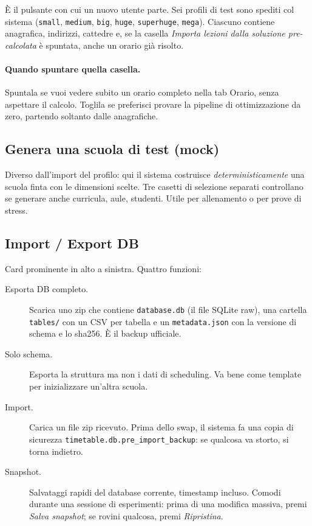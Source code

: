\`E il pulsante con cui un nuovo utente parte. Sei profili di
test sono spediti col sistema (\texttt{small}, \texttt{medium},
\texttt{big}, \texttt{huge}, \texttt{superhuge}, \texttt{mega}).
Ciascuno contiene anagrafica, indirizzi, cattedre e, se la
casella \emph{Importa lezioni dalla soluzione pre-calcolata} \`e
spuntata, anche un orario gi\`a risolto.

\paragraph{Quando spuntare quella casella.}
Spuntala se vuoi vedere subito un orario completo nella tab
Orario, senza aspettare il calcolo. Toglila se preferisci
provare la pipeline di ottimizzazione da zero, partendo
soltanto dalle anagrafiche.

\subsection{Genera una scuola di test (mock)}

Diverso dall'import del profilo: qui il sistema costruisce
\emph{deterministicamente} una scuola finta con le dimensioni
scelte. Tre casetti di selezione separati controllano se generare
anche curricula, aule, studenti. Utile per allenamento o per
prove di stress.

\subsection{Import / Export DB}

Card prominente in alto a sinistra. Quattro funzioni:

\begin{description}
\item[Esporta DB completo.] Scarica uno zip che contiene
  \texttt{database.db} (il file SQLite raw), una cartella
  \texttt{tables/} con un CSV per tabella e un
  \texttt{metadata.json} con la versione di schema e lo
  sha256. \`E il backup ufficiale.
\item[Solo schema.] Esporta la struttura ma non i dati di
  scheduling. Va bene come template per inizializzare un'altra
  scuola.
\item[Import.] Carica un file zip ricevuto. Prima dello swap, il
  sistema fa una copia di sicurezza
  \texttt{timetable.db.pre\_import\_backup}: se qualcosa va
  storto, si torna indietro.
\item[Snapshot.] Salvataggi rapidi del database corrente,
  timestamp incluso. Comodi durante una sessione di
  esperimenti: prima di una modifica massiva, premi
  \emph{Salva snapshot}; se rovini qualcosa, premi
  \emph{Ripristina}.
\end{description}

